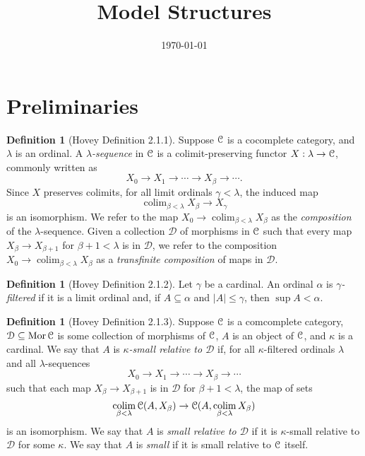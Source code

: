 \documentclass{amsart}
\title{Model Structures}
\author{}
\date{\today}
\theoremstyle{plain}
\theoremstyle{definition}
\newtheorem{definition}[theorem]{Definition}
\newcommand{\sseq}{\subseteq}
\newcommand{\0}{\mathbf{0}}
\newcommand{\cC}{\mathcal C}
\newcommand{\cD}{\mathcal D}
\renewcommand{\(}{\left(}
\renewcommand{\)}{\right)}
\def\scr{\EuScript}
\def\cC{\scr{C}}
\DeclareMathOperator*{\colim}{colim}
\DeclareMathOperator{\Mor}{Mor}
\begin{document}
\maketitle


\tableofcontents

\section{Preliminaries}

\begin{definition}[Hovey Definition 2.1.1]
  Suppose $\cC$ is a cocomplete category, and $\lambda$ is an ordinal. A \textit{$\lambda$-sequence} in $\cC$ is a colimit-preserving functor $X:\lambda\to\cC$, commonly written as
  \[X_0\to X_1\to\cdots\to X_\beta\to\cdots.\]
  Since $X$ preserves colimits, for all limit ordinals $\gamma<\lambda$, the induced map
  \[\colim_{\beta<\lambda}X_\beta\to X_\gamma\]
  is an isomorphism. We refer to the map $X_0\to \colim_{\beta<\lambda}X_\beta$ as the \textit{composition} of the $\lambda$-sequence. Given a collection $\cD$ of morphisms in $\cC$ such that every map $X_\beta\to X_{\beta+1}$ for $\beta+1<\lambda$ is in $\cD$, we refer to the composition $X_0\to\colim_{\beta<\lambda}X_\beta$ as a \textit{transfinite composition} of maps in $\cD$.
\end{definition}

\begin{definition}[Hovey Definition 2.1.2]
  Let $\gamma$ be a cardinal. An ordinal $\alpha$ is \textit{$\gamma$-filtered} if it is a limit ordinal and, if $A\sseq\alpha$ and $|A|\leq\gamma$, then $\sup A<\alpha$.
\end{definition}

\begin{definition}[Hovey Definition 2.1.3]
  Suppose $\cC$ is a comcomplete category, $\cD\sseq\Mor\cC$ is some collection of morphisms of $\cC$, $A$ is an object of $\cC$, and $\kappa$ is a cardinal. We say that $A$ is \textit{$\kappa$-small relative to $\cD$} if, for all $\kappa$-filtered ordinals $\lambda$ and all $\lambda$-sequences
  \[X_0\to X_1\to\cdots\to X_\beta\to\cdots\]
  such that each map $X_\beta\to X_{\beta+1}$ is in $\cD$ for $\beta+1<\lambda$, the map of sets
  \[\colim_{\beta<\lambda}\cC(A,X_\beta)\to\cC(A,\colim_{\beta<\lambda}X_\beta)\]
  is an isomorphism. We say that $A$ is \textit{small relative to $\cD$} if it is $\kappa$-small relative to $\cD$ for some $\kappa$. We say that $A$ is \textit{small} if it is small relative to $\cC$ itself.
\end{definition}
\end{document}
